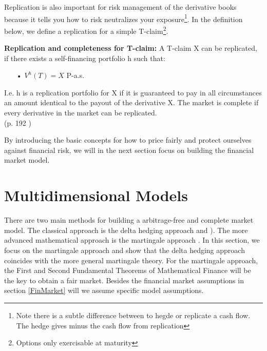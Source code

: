 Replication is also important for risk management of the derivative books because it tells you how to risk neutralizes your exposure\footnote{Note there is a subtle difference between to hegde or replicate a cash flow. The hedge gives minus the cash flow from replication}. In the definition below, we define a replication for a simple T-claim\footnote{Options only exercisable at maturity}.
\theoremstyle{definition}
\begin{definition}{\textbf{Replication and completeness for T-claim: }}
A T-claim X can be replicated, if there exists a self-financing portfolio h such that:
\begin{enumerate}
\item[•] $V^{h}(T)=X$ P-a.s.
\end{enumerate}
I.e. h is a replication portfolio for X if it is guaranteed to pay in all circumstances an amount identical to the payout of the derivative X.
The market is complete if every derivative in the market can be replicated.\\
\null \hfill (p. 192 \parencite{finKont})
\end{definition}

By introducing the basic concepts for how to price fairly and protect ourselves against financial risk, we will in the next section focus on building the financial market model.


\section{Multidimensional Models}\label{MultiDimModel}
There are two main methods for building a arbitrage-free and complete market model. The classical approach is the delta hedging approach \parencite{B-S-Paper} and \parencite{CRR}). The more advanced mathematical approach is the martingale approach  \parencite{finKont}. In this section, we focus on the martingale approach and show that the delta hedging approach coincides with the more general martingale theory. For the martingale approach, the First and Second Fundamental Theorems of Mathematical Finance will be the key to obtain a fair market. Besides the financial market assumptions in section \ref{FinMarket} will we assume specific model assumptions.

